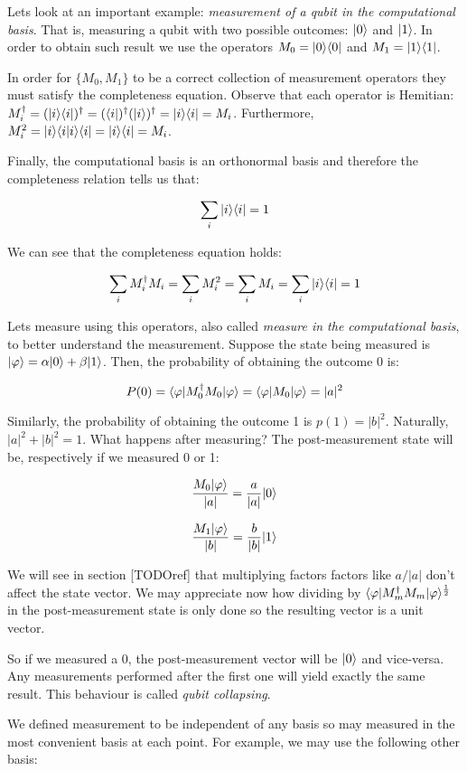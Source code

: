 Lets look at an important example: \emph{measurement of a qubit in the computational basis}. That is, measuring a qubit with two possible outcomes: $|0\rangle$ and $|1\rangle$. In order to obtain such result we use the operators $M_0 = |0\rangle \langle 0|$ and $M_1 = |1\rangle \langle 1|$.

In order for $\{M_0, M_1\}$ to be a correct collection of measurement operators they must satisfy the completeness equation. Observe that each operator is Hemitian: $M_i^\dagger = (|i\rangle \langle i|)^\dagger = (\langle i|)^\dagger (|i\rangle)^\dagger = |i\rangle \langle i| = M_i$. Furthermore, $M_i^2 = |i\rangle \langle i|i\rangle \langle i| = |i\rangle \langle i| = M_i$.

Finally, the computational basis is an orthonormal basis and therefore the completeness relation tells us that:

$$ \sum_i |i\rangle\langle i| = 1 $$

We can see that the completeness equation holds:

$$ \sum_i M_i^\dagger M_i = \sum_i M_i^2 = \sum_i M_i = \sum_i |i\rangle\langle i| = 1 $$

Lets measure using this operators, also called \emph{measure in the computational basis}, to better understand the measurement. Suppose the state being measured is $|\varphi\rangle = \alpha|0\rangle + \beta|1\rangle$. Then, the probability of obtaining the outcome 0 is:

$$ P(0) = \langle\varphi|M_0^\dagger M_0|\varphi\rangle = \langle\varphi|M_0|\varphi\rangle = |a|^2 $$

Similarly, the probability of obtaining the outcome 1 is $p(1) = |b|^2$. Naturally, $ |a|^2 + |b|^2 = 1$. What happens after measuring? The post-measurement state will be, respectively if we measured 0 or 1:

$$ \frac{M_0|\varphi\rangle}{|a|} = \frac{a}{|a|}|0\rangle$$

$$ \frac{M_1|\varphi\rangle}{|b|} = \frac{b}{|b|}|1\rangle$$

We will see in section [TODOref] that multiplying factors factors like $a/|a|$ don't affect the state vector. We may appreciate now how dividing by $\langle\varphi|M_m^\dagger M_m|\varphi\rangle^{\frac{1}{2}}$ in the post-measurement state is only done so the resulting vector is a unit vector.

So if we measured a 0, the post-measurement vector will be $|0\rangle$ and vice-versa. Any measurements performed after the first one will yield exactly the same result. This behaviour is called \emph{qubit collapsing}.

We defined measurement to be independent of any basis so may measured in the most convenient basis at each point. For example, we may use the following other basis:


